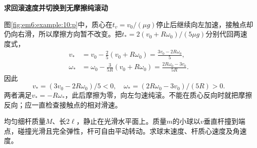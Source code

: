 \begin{solution}
\par\medskip{}\noindent\textbf{求回滚速度并切换到无摩擦纯滚动}\par\nobreak
图\ref{fig:em6:example:10:p}中，质心在$t_v=v_0/(\mu g)$停止后继续向左加速，接触点却仍向右滑，所以摩擦方向暂不改变。把$t_*=2(v_0+R\omega_0)/(5\mu g)$分别代回两速度式，
\begin{align*}
v_*&=v_0-\frac25(v_0+R\omega_0)
=\frac{3v_0-2R\omega_0}{5},\\
\omega_*&=\omega_0-\frac{3}{5R}(v_0+R\omega_0)
=\frac{2R\omega_0-3v_0}{5R}.
\end{align*}
因此
\[\boxed{v_*=(3v_0-2R\omega_0)/5<0,\quad\omega_*=(2R\omega_0-3v_0)/(5R)>0}.\]
两者满足$v_*=-R\omega_*$，此后摩擦为零，向左匀速纯滚。不能在质心反向时就把摩擦反向；应一直检查接触点的相对滑速。\end{solution}
\begin{question}\begin{example}[自由细杆的端点弹性冲击]\label{em6:example:11}
均匀细杆质量$M$、长$2\ell$，静止在光滑水平面上。质量$m$的小球以$v$垂直杆撞到端点，碰撞光滑且完全弹性，杆可自由平动转动。求球末速度、杆质心速度及角速度。
\end{example}
\end{question}
